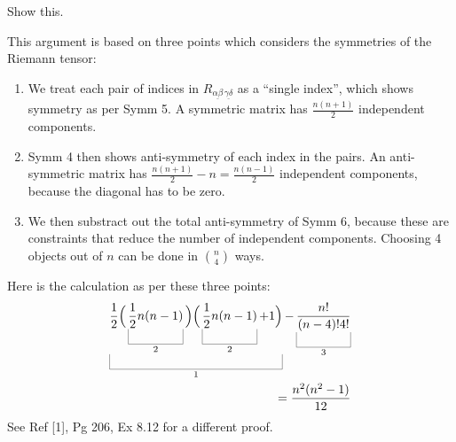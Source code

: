 \documentclass[10pt]{article}
\begin{document}
\begin{example}\label{b3e21}
	Show this.
\end{example}
\sol This argument is based on three points which considers the symmetries of the Riemann tensor:
\begin{enumerate}
	\item We treat each pair of indices in $R_{\underline{\alpha\beta}\,\underline{\gamma\delta}}$ as a ``single index'', which shows symmetry as per Symm 5. A symmetric matrix has $\frac{n(n+1)}{2}$ independent components.
	\item Symm 4 then shows anti-symmetry of each index in the pairs. An anti-symmetric matrix has $\frac{n(n+1)}{2}-n=\frac{n(n-1)}{2}$ independent components, because the diagonal has to be zero.
	\item We then substract out the total anti-symmetry of Symm 6, because these are constraints that reduce the number of independent components. Choosing 4 objects out of $n$ can be done in ${n \choose 4}$ ways.
\end{enumerate}
Here is the calculation as per these three points:
$$
\begin{aligned}
	\ub{\frac12\Big(\ub{\frac12n(n-1)}{2}\Big)\Big(\ub{\frac12n(n-1)}{2}+1\Big)}{1} - \ub{\frac{n!}{(n-4)!4!}}{3}\\
	=\frac{n^2(n^2-1)}{12}
\end{aligned}
$$
See Ref [1], Pg 206, Ex 8.12 for a different proof.
\end{document}
